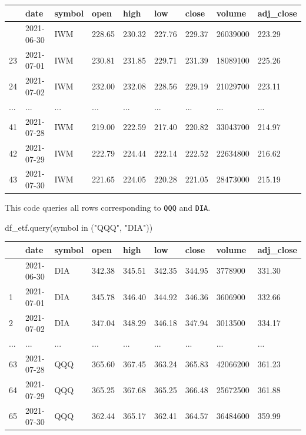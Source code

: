 \documentclass[
  letterpaper,
  DIV=11,
  numbers=noendperiod]{scrreprt}
\newenvironment{Shaded}{\begin{snugshade}}{\end{snugshade}}
\newcommand{\NormalTok}[1]{\textcolor[rgb]{0.00,0.23,0.31}{#1}}
\newcommand{\StringTok}[1]{\textcolor[rgb]{0.13,0.47,0.30}{#1}}
\begin{document}
\begin{longtable}[]{@{}lllllllll@{}}
\toprule\noalign{}
& date & symbol & open & high & low & close & volume & adj\_close \\
\midrule\noalign{}
\endhead
\bottomrule\noalign{}
\endlastfoot
22 & 2021-06-30 & IWM & 228.65 & 230.32 & 227.76 & 229.37 & 26039000 &
223.29 \\
23 & 2021-07-01 & IWM & 230.81 & 231.85 & 229.71 & 231.39 & 18089100 &
225.26 \\
24 & 2021-07-02 & IWM & 232.00 & 232.08 & 228.56 & 229.19 & 21029700 &
223.11 \\
... & ... & ... & ... & ... & ... & ... & ... & ... \\
41 & 2021-07-28 & IWM & 219.00 & 222.59 & 217.40 & 220.82 & 33043700 &
214.97 \\
42 & 2021-07-29 & IWM & 222.79 & 224.44 & 222.14 & 222.52 & 22634800 &
216.62 \\
43 & 2021-07-30 & IWM & 221.65 & 224.05 & 220.28 & 221.05 & 28473000 &
215.19 \\
\end{longtable}

This code queries all rows corresponding to \texttt{QQQ} and
\texttt{DIA}.

\begin{Shaded}
\begin{Highlighting}[]
\NormalTok{df\_etf.query(}\StringTok{\textquotesingle{}symbol in ("QQQ", "DIA")\textquotesingle{}}\NormalTok{)}
\end{Highlighting}
\end{Shaded}

\begin{longtable}[]{@{}lllllllll@{}}
\toprule\noalign{}
& date & symbol & open & high & low & close & volume & adj\_close \\
\midrule\noalign{}
\endhead
\bottomrule\noalign{}
\endlastfoot
0 & 2021-06-30 & DIA & 342.38 & 345.51 & 342.35 & 344.95 & 3778900 &
331.30 \\
1 & 2021-07-01 & DIA & 345.78 & 346.40 & 344.92 & 346.36 & 3606900 &
332.66 \\
2 & 2021-07-02 & DIA & 347.04 & 348.29 & 346.18 & 347.94 & 3013500 &
334.17 \\
... & ... & ... & ... & ... & ... & ... & ... & ... \\
63 & 2021-07-28 & QQQ & 365.60 & 367.45 & 363.24 & 365.83 & 42066200 &
361.23 \\
64 & 2021-07-29 & QQQ & 365.25 & 367.68 & 365.25 & 366.48 & 25672500 &
361.88 \\
65 & 2021-07-30 & QQQ & 362.44 & 365.17 & 362.41 & 364.57 & 36484600 &
359.99 \\
\end{longtable}
\end{document}
